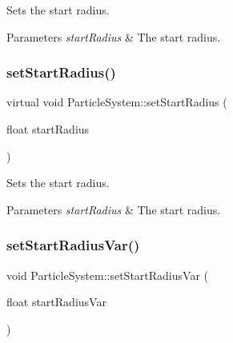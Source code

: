 Sets the start radius.


\begin{DoxyParams}{Parameters}
{\em start\+Radius} & The start radius. \\
\hline
\end{DoxyParams}
\mbox{\label{classParticleSystem_a4e8d7237e66e03f81bc1688a5000602f}} 
\subsubsection{\texorpdfstring{set\+Start\+Radius()}{setStartRadius()}\hspace{0.1cm}{\footnotesize\ttfamily [2/2]}}
{\footnotesize\ttfamily virtual void Particle\+System\+::set\+Start\+Radius (\begin{DoxyParamCaption}\item[{float}]{start\+Radius }\end{DoxyParamCaption})\hspace{0.3cm}{\ttfamily [virtual]}}

Sets the start radius.


\begin{DoxyParams}{Parameters}
{\em start\+Radius} & The start radius. \\
\hline
\end{DoxyParams}
\mbox{\label{classParticleSystem_accdf68ba0c7c75b3e94d14f8c11de163}} 
\subsubsection{\texorpdfstring{set\+Start\+Radius\+Var()}{setStartRadiusVar()}\hspace{0.1cm}{\footnotesize\ttfamily [1/2]}}
{\footnotesize\ttfamily void Particle\+System\+::set\+Start\+Radius\+Var (\begin{DoxyParamCaption}\item[{float}]{start\+Radius\+Var }\end{DoxyParamCaption})\hspace{0.3cm}{\ttfamily [virtual]}}

